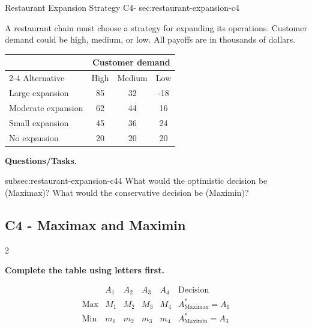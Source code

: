 	\sectionScored
	{Restaurant Expansion Strategy}
	{C4-}
	{sec:restaurant-expansion-c4}
	{
		A restaurant chain must choose a strategy for expanding its operations.
		Customer demand could be high, medium, or low. All payoffs are in
		thousands of dollars.
		
		\begin{center}
			\renewcommand{\arraystretch}{1.3}
			\small
			\begin{tabular}{lccc}
				\toprule
				& \multicolumn{3}{c}{Customer demand} \\
				\cmidrule(lr){2-4}
				Alternative & High & Medium & Low \\
				\midrule
				Large expansion & 85 & 32 & -18 \\
				Moderate expansion & 62 & 44 & 16 \\
				Small expansion & 45 & 36 & 24 \\
				No expansion & 20 & 20 & 20 \\
				\bottomrule
			\end{tabular}
		\end{center}
		\vspace{-5mm}
		
		\textbf{Questions/Tasks.}
		\begin{enumerate}
			\CriterionTask
			{subsec:restaurant-expansion-c4}{4}
			{What would the optimistic decision be (Maximax)? What would the conservative decision be (Maximin)? }
		\end{enumerate}
		
		\label{subsec:restaurant-expansion-c4}
		\subsection*{C4 - Maximax and Maximin }
		
		
		\begin{multicols}{2}
			
			\textbf{Complete the table using letters first.}
			
			\[
			\begin{array}{c|ccccc}
				& A_1 & A_2 & A_3 & A_4 & \text{Decision}\\
				\hline
				\text{Max} &
				M_1 & M_2 & M_3 & M_4 &
				A^*_{\mathrm{Maximax}}=A_1
				\\
				\text{Min} &
				m_1 & m_2 & m_3 & m_4 &
				A^*_{\mathrm{Maximin}}=A_3
			\end{array}
			\]
			

\end{multicols}}
